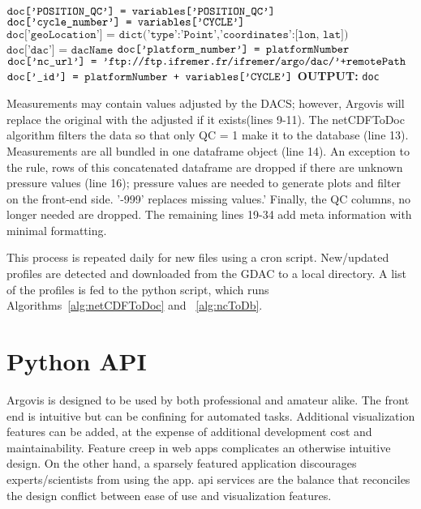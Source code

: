 \begin{algorithm}
\begin{algorithmic}[1]
\State $\texttt{doc['POSITION\textunderscore QC'] = variables['POSITION\textunderscore QC']}$
\State $\texttt{doc['cycle\textunderscore number'] = variables['CYCLE']}$
\State $\texttt{doc['geoLocation'] = dict('type':'Point','coordinates':[lon, lat])}$
\State $\texttt{doc['dac'] = dacName}$
\State $\texttt{doc['platform\textunderscore number'] = platformNumber}$
\State $\texttt{doc['nc\textunderscore url'] = 'ftp://ftp.ifremer.fr/ifremer/argo/dac/'+remotePath}$
\State $\texttt{doc['\textunderscore id'] = platformNumber + variables['CYCLE']}$
\State \textbf{OUTPUT:} \texttt{doc}
\EndProcedure
\end{algorithmic}
\end{algorithm}

Measurements may contain values adjusted by the DACS; however, Argovis will replace the original with the adjusted if it exists(lines 9-11). The netCDFToDoc algorithm filters the data so that only QC = 1 make it to the database (line 13). Measurements are all bundled in one \gls{dataframe} object (line 14). An exception to the rule, rows of this concatenated dataframe are dropped if there are unknown pressure values (line 16); pressure values are needed to generate plots and filter on the front-end side. '-999' replaces missing values.' Finally, the QC columns, no longer needed are dropped. The remaining lines 19-34 add meta information with minimal formatting.

This process is repeated daily for new files using a \gls{cron} script. New/updated profiles are detected and downloaded from the GDAC to a local directory. A list of the profiles is fed to the python script, which runs Algorithms~\ref{alg:netCDFToDoc} and ~\ref{alg:ncToDb}.

\section{Python API}\label{sec:api}

Argovis is designed to be used by both professional and amateur alike. The front end is intuitive but can be confining for automated tasks. Additional visualization features can be added, at the expense of additional development cost and maintainability. Feature creep in web apps complicates an otherwise intuitive design. On the other hand, a sparsely featured application discourages experts/scientists from using the app. \gls{api} services are the balance that reconciles the design conflict between ease of use and visualization features.

